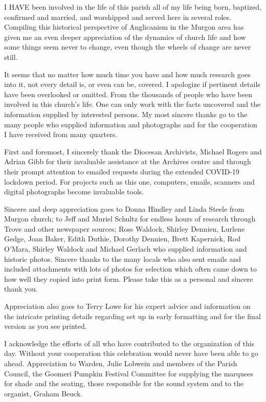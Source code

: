 \lettrine[lines=3]{I}{ HAVE}
 been involved in the life of this parish all of my life being born, baptized, confirmed and married, and worshipped and served here in several roles. Compiling this historical perspective of Anglicanism in the Murgon area has given me an even deeper appreciation of the dynamics of church life and how some things seem never to change, even though the wheels of change are never still.

It seems that no matter how much time you have and how much research goes into it, not every detail is, or even can be, covered. I apologize if pertinent details have been overlooked or omitted. From the thousands of people who have been involved in this church's life. One can only work with the facts uncovered and the information supplied by interested persons. My most sincere thanks go to the many people who supplied information and photographs and for the cooperation I have received from many quarters.



First and foremost, I sincerely thank the Diocesan Archivists, Michael Rogers and Adrian Gibb for their invaluable assistance at the Archives centre and through their prompt attention to emailed requests during the extended COVID-19 lockdown period. For projects such as this one, computers, emails, scanners and digital photographs become invaluable tools.



Sincere and deep appreciation goes to Donna Hindley and Linda Steele from Murgon church; to Jeff and Muriel Schultz for endless hours of research through Trove and other newspaper sources; Ross Waldock, Shirley Dennien, Lurlene Gedge, Joan Baker, Edith Duthie, Dorothy Dennien, Brett Kapernick, Rod O'Mara, Shirley Waldock and Michael Gerlach who supplied information and historic photos. Sincere thanks to the many locals who also sent emails and included attachments with lots of photos for selection which often came down to how well they copied into print form. Please take this as a personal and sincere thank you.



Appreciation also goes to Terry Lowe for his expert advice and information on the intricate printing details regarding set up in early formatting and for the final version as you see printed.



I acknowledge the efforts of all who have contributed to the organization of this day. Without your cooperation this celebration would never have been able to go ahead. Appreciation to Warden, Julie Lobwein and members of the Parish Council, the Goomeri Pumpkin Festival Committee for supplying the marquees for shade and the seating, those responsible for the sound system and to the organist, Graham Beuck.




